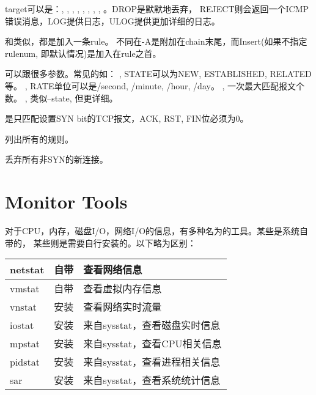 target可以是：, , , , ,
, , , 。DROP是默默地丢弃，
REJECT则会返回一个ICMP错误消息，LOG提供日志，ULOG提供更加详细的日志。

和类似，都是加入一条rule。
不同在-A是附加在chain末尾，而Insert(如果不指定rulenum, 即默认情况)是加入在rule之首。

可以跟很多参数。常见的如：
, STATE可以为NEW, ESTABLISHED, RELATED等。
, RATE单位可以是/second, /minute, /hour, /day。
, 一次最大匹配报文个数。    %
, 类似--state, 但更详细。

是只匹配设置SYN bit的TCP报文，ACK, RST, FIN位必须为0。

列出所有的规则。


丢弃所有非SYN的新连接。

\chapter{Monitor Tools}
对于CPU，内存，磁盘I/O，网络I/O的信息，有多种名为的工具。某些是系统自带的，
某些则是需要自行安装的。以下略为区别：

\begin{tabular}{|l|l|l|}
netstat   & 自带    & 查看网络信息          \\\hline
vmstat    & 自带    & 查看虚拟内存信息      \\\hline
vnstat    & 安装    & 查看网络实时流量      \\\hline
iostat    & 安装    & 来自sysstat，查看磁盘实时信息     \\\hline
mpstat    & 安装    & 来自sysstat，查看CPU相关信息      \\\hline
pidstat   & 安装    & 来自sysstat，查看进程相关信息     \\\hline
sar       & 安装    & 来自sysstat，查看系统统计信息     \\\hline
\end{tabular}


